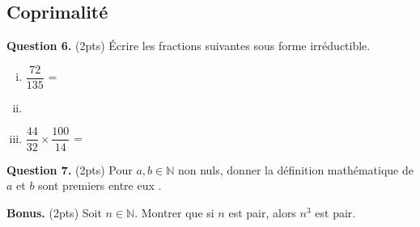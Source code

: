 \documentclass[a4paper, 14pt]{extarticle}
\theoremstyle{plain}
\theoremstyle{definition}
\newcommand{\N}{\mathbb{N}}
\begin{document}
\subsection*{Coprimalité}


	
	\noindent
	\textbf{Question 6.} (2pts) Écrire les fractions suivantes sous forme irréductible.
			\begin{enumerate}[i)]
				\item $\dfrac{72}{135}$ =
				\item[] \vspace{.5cm}
				\item $\dfrac{44}{32} \times  \dfrac{100}{14}$ = 
			\end{enumerate}
	\vspace{1cm}

	\noindent
	\textbf{Question 7.} (2pts) Pour $a, b \in \N$ non nuls, donner la définition mathématique de \og $a$ et $b$ sont premiers entre eux \fg.
	\vspace{7cm}
	
	\noindent
	\textbf{Bonus.} (2pts) Soit $n\in \N$. Montrer que si $n$ est pair, alors $n^3$ est pair.
	\vspace{8cm}
\end{document}
